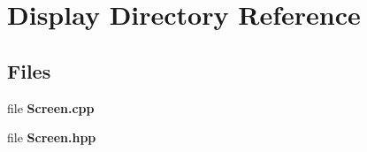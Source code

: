 \section{Display Directory Reference}
\label{dir_24817a301ba3256d5cc3ff5fb28dbe0b}
\subsection*{Files}
\begin{DoxyCompactItemize}
\item 
file {\bf Screen.\-cpp}
\item 
file {\bf Screen.\-hpp}
\end{DoxyCompactItemize}
